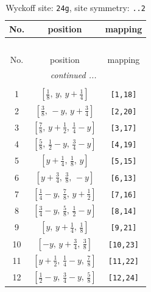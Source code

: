 \documentclass[fleqn,8pt]{jsarticle}
\begin{document}
\begin{longtable}{ccc}
\caption{Wyckoff site: {\tt 24g}, site symmetry: {\tt ..2}}
 \\
 \hline \hline
No. & position & mapping \\ \hline \endfirsthead

\multicolumn{2}{l}{\tablename\ \thetable{}} \\
 \hline \hline
No. & position & mapping \\ \hline \endhead

 \hline \hline
\multicolumn{2}{r}{\footnotesize\it continued ...} \\ \endfoot

 \hline \hline
\multicolumn{2}{r}{} \\ \endlastfoot

1 & $\left[ \frac{1}{8},\, y,\, y + \frac{1}{4} \right]$ & {\tt [1,18]} \\ \hline
2 & $\left[ \frac{3}{8},\, - y,\, y + \frac{3}{4} \right]$ & {\tt [2,20]} \\ \hline
3 & $\left[ \frac{7}{8},\, y + \frac{1}{2},\, \frac{1}{4} - y \right]$ & {\tt [3,17]} \\ \hline
4 & $\left[ \frac{5}{8},\, \frac{1}{2} - y,\, \frac{3}{4} - y \right]$ & {\tt [4,19]} \\ \hline
5 & $\left[ y + \frac{1}{4},\, \frac{1}{8},\, y \right]$ & {\tt [5,15]} \\ \hline
6 & $\left[ y + \frac{3}{4},\, \frac{3}{8},\, - y \right]$ & {\tt [6,13]} \\ \hline
7 & $\left[ \frac{1}{4} - y,\, \frac{7}{8},\, y + \frac{1}{2} \right]$ & {\tt [7,16]} \\ \hline
8 & $\left[ \frac{3}{4} - y,\, \frac{5}{8},\, \frac{1}{2} - y \right]$ & {\tt [8,14]} \\ \hline
9 & $\left[ y,\, y + \frac{1}{4},\, \frac{1}{8} \right]$ & {\tt [9,21]} \\ \hline
10 & $\left[ - y,\, y + \frac{3}{4},\, \frac{3}{8} \right]$ & {\tt [10,23]} \\ \hline
11 & $\left[ y + \frac{1}{2},\, \frac{1}{4} - y,\, \frac{7}{8} \right]$ & {\tt [11,22]} \\ \hline
12 & $\left[ \frac{1}{2} - y,\, \frac{3}{4} - y,\, \frac{5}{8} \right]$ & {\tt [12,24]} \\
\end{longtable}
\renewcommand{\arraystretch}{1.2}
\end{document}
